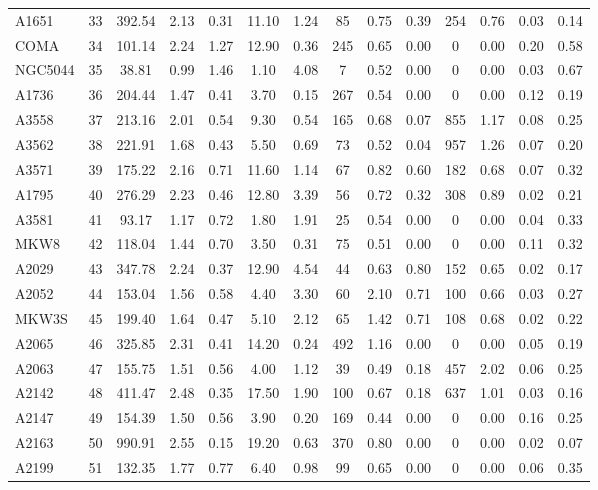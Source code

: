 \documentclass[10pt,aps,pra,reprint,amsmath,amsfonts,amssymb,showpacs,nofootinbib,floatfix]{revtex4-1}
\newcommand{\vst}{\vspace{-0.14mm}}
\begin{document}
{\begin{table}
\begin{minipage}{2.0\columnwidth}
\begin{tabular}{l c c c c c c c c c c c c c}
A1651 & 33 & 392.54 & 2.13 & 0.31 & 11.10 & 1.24 & 85 & 0.75 & 0.39 & 254 & 0.76 & 0.03 & 0.14 \vst \\
COMA & 34 & 101.14 & 2.24 & 1.27 & 12.90 & 0.36 & 245 & 0.65 & 0.00 & 0 & 0.00 & 0.20 & 0.58 \vst \\
NGC5044 & 35 & 38.81 & 0.99 & 1.46 & 1.10 & 4.08 & 7 & 0.52 & 0.00 & 0 & 0.00 & 0.03 & 0.67 \vst \\
A1736 & 36 & 204.44 & 1.47 & 0.41 & 3.70 & 0.15 & 267 & 0.54 & 0.00 & 0 & 0.00 & 0.12 & 0.19 \vst \\
A3558 & 37 & 213.16 & 2.01 & 0.54 & 9.30 & 0.54 & 165 & 0.68 & 0.07 & 855 & 1.17 & 0.08 & 0.25 \vst \\
A3562 & 38 & 221.91 & 1.68 & 0.43 & 5.50 & 0.69 & 73 & 0.52 & 0.04 & 957 & 1.26 & 0.07 & 0.20 \vst \\
A3571 & 39 & 175.22 & 2.16 & 0.71 & 11.60 & 1.14 & 67 & 0.82 & 0.60 & 182 & 0.68 & 0.07 & 0.32 \vst \\
A1795 & 40 & 276.29 & 2.23 & 0.46 & 12.80 & 3.39 & 56 & 0.72 & 0.32 & 308 & 0.89 & 0.02 & 0.21 \vst \\
A3581 & 41 & 93.17 & 1.17 & 0.72 & 1.80 & 1.91 & 25 & 0.54 & 0.00 & 0 & 0.00 & 0.04 & 0.33 \vst \\
MKW8 & 42 & 118.04 & 1.44 & 0.70 & 3.50 & 0.31 & 75 & 0.51 & 0.00 & 0 & 0.00 & 0.11 & 0.32 \vst \\
A2029 & 43 & 347.78 & 2.24 & 0.37 & 12.90 & 4.54 & 44 & 0.63 & 0.80 & 152 & 0.65 & 0.02 & 0.17 \vst \\
A2052 & 44 & 153.04 & 1.56 & 0.58 & 4.40 & 3.30 & 60 & 2.10 & 0.71 & 100 & 0.66 & 0.03 & 0.27 \vst \\
MKW3S & 45 & 199.40 & 1.64 & 0.47 & 5.10 & 2.12 & 65 & 1.42 & 0.71 & 108 & 0.68 & 0.02 & 0.22 \vst \\
A2065 & 46 & 325.85 & 2.31 & 0.41 & 14.20 & 0.24 & 492 & 1.16 & 0.00 & 0 & 0.00 & 0.05 & 0.19 \vst \\
A2063 & 47 & 155.75 & 1.51 & 0.56 & 4.00 & 1.12 & 39 & 0.49 & 0.18 & 457 & 2.02 & 0.06 & 0.25 \vst \\
A2142 & 48 & 411.47 & 2.48 & 0.35 & 17.50 & 1.90 & 100 & 0.67 & 0.18 & 637 & 1.01 & 0.03 & 0.16 \vst \\
A2147 & 49 & 154.39 & 1.50 & 0.56 & 3.90 & 0.20 & 169 & 0.44 & 0.00 & 0 & 0.00 & 0.16 & 0.25 \vst \\
A2163 & 50 & 990.91 & 2.55 & 0.15 & 19.20 & 0.63 & 370 & 0.80 & 0.00 & 0 & 0.00 & 0.02 & 0.07 \vst \\
A2199 & 51 & 132.35 & 1.77 & 0.77 & 6.40 & 0.98 & 99 & 0.65 & 0.00 & 0 & 0.00 & 0.06 & 0.35 \vst \\

\end{tabular}
\end{minipage}
\end{table}}
\end{document}
